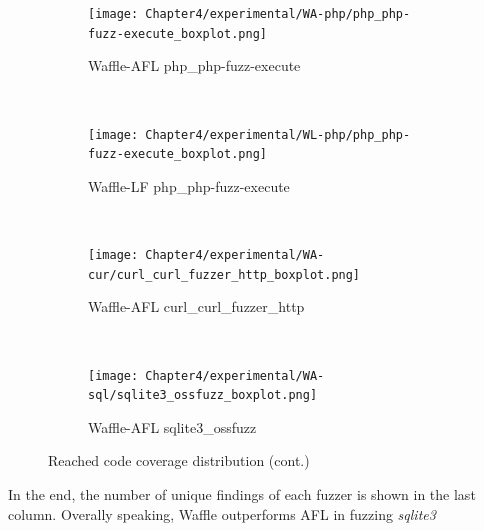 \begin{figure}[!t]\ContinuedFloat
    \begin{adjustbox}{center,max width=1.3\textwidth}
        \begin{subfigure}[t]{0.5\textwidth}
            \centering
            \texttt{[image: Chapter4/experimental/WA-php/php\_php-fuzz-execute\_boxplot.png]}
            \vspace*{-5mm}
            \caption{Waffle-AFL php\_php-fuzz-execute}
            \label{box:wap}
            \vspace*{5mm}
        \end{subfigure}
        ~
        \begin{subfigure}[t]{0.5\textwidth}
            \centering
            \texttt{[image: Chapter4/experimental/WL-php/php\_php-fuzz-execute\_boxplot.png]}
            \vspace*{-5mm}
            \caption{Waffle-LF php\_php-fuzz-execute}
            \label{box:wlp}
            \vspace*{5mm}
        \end{subfigure}
    \end{adjustbox}
    ~
    \begin{adjustbox}{center,max width=1.3\textwidth}
        
        \begin{subfigure}[t]{0.5\textwidth}
            \centering
            \texttt{[image: Chapter4/experimental/WA-cur/curl\_curl\_fuzzer\_http\_boxplot.png]}
            \vspace*{-5mm}
            \caption{Waffle-AFL curl\_curl\_fuzzer\_http}
            \label{box:wac}
            \vspace*{5mm}
        \end{subfigure}
        ~
        \begin{subfigure}[t]{0.5\textwidth}
            \centering
            \texttt{[image: Chapter4/experimental/WA-sql/sqlite3\_ossfuzz\_boxplot.png]}
            \vspace*{-5mm}
            \caption{Waffle-AFL sqlite3\_ossfuzz}
            \label{box:was}
            \vspace*{5mm}
        \end{subfigure}
    \end{adjustbox}
    \caption{Reached code coverage distribution (cont.)}
\end{figure}

In the end, the number of unique findings of each fuzzer is shown in the last column. Overally speaking, Waffle outperforms AFL in fuzzing \textit{sqlite3}

